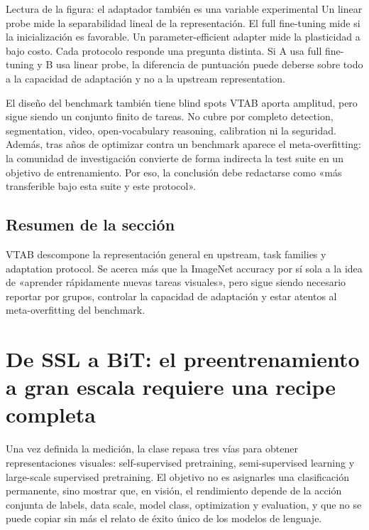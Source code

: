 \documentclass[a4paper]{article}
\begin{document}
\begin{knowledgebox}{Lectura de la figura: el adaptador también es una variable experimental}
Un linear probe mide la separabilidad lineal de la representación. El full fine-tuning mide si la inicialización es favorable. Un parameter-efficient adapter mide la plasticidad a bajo costo. Cada protocolo responde una pregunta distinta. Si A usa full fine-tuning y B usa linear probe, la diferencia de puntuación puede deberse sobre todo a la capacidad de adaptación y no a la upstream representation.
\end{knowledgebox}

\begin{warningbox}{El diseño del benchmark también tiene blind spots}
VTAB aporta amplitud, pero sigue siendo un conjunto finito de tareas. No cubre por completo detection, segmentation, video, open-vocabulary reasoning, calibration ni la seguridad. Además, tras años de optimizar contra un benchmark aparece el meta-overfitting: la comunidad de investigación convierte de forma indirecta la test suite en un objetivo de entrenamiento. Por eso, la conclusión debe redactarse como «más transferible bajo esta suite y este protocol».
\end{warningbox}


\subsection{Resumen de la sección}

VTAB descompone la representación general en upstream, task families y adaptation protocol. Se acerca más que la ImageNet accuracy por sí sola a la idea de «aprender rápidamente nuevas tareas visuales», pero sigue siendo necesario reportar por grupos, controlar la capacidad de adaptación y estar atentos al meta-overfitting del benchmark.
\section{De SSL a BiT: el preentrenamiento a gran escala requiere una recipe completa}

Una vez definida la medición, la clase repasa tres vías para obtener representaciones visuales: self-supervised pretraining, semi-supervised learning y large-scale supervised pretraining. El objetivo no es asignarles una clasificación permanente, sino mostrar que, en visión, el rendimiento depende de la acción conjunta de labels, data scale, model class, optimization y evaluation, y que no se puede copiar sin más el relato de éxito único de los modelos de lenguaje.
\end{document}
